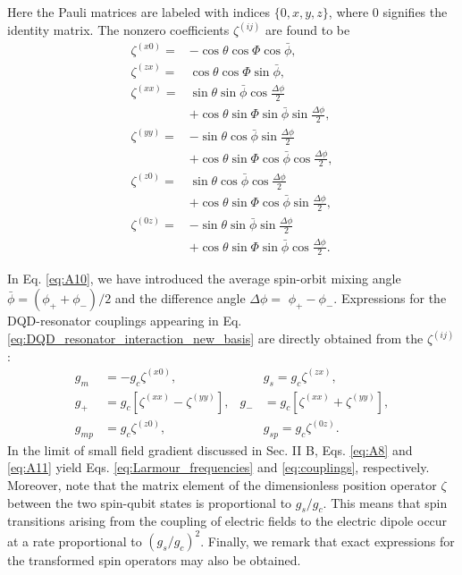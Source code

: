 \documentclass[12pt]{article}
\begin{document}
Here the Pauli matrices are labeled with indices $\{0, x, y, z\}$, where 0 signifies the identity matrix. The nonzero coefficients
$\zeta^{(i j)}$ are found to be
\begin{equation}\label{eq:A10}
    \begin{aligned}
        \zeta^{(x 0)}= & -\cos \theta \cos \Phi \cos \bar{\phi}, \\
        \zeta^{(z x)}= & \cos \theta \cos \Phi \sin \bar{\phi}, \\
        \zeta^{(x x)}= & \sin \theta \sin \bar{\phi} \cos \frac{\Delta \phi}{2} \\
        & +\cos \theta \sin \Phi \sin \bar{\phi} \sin \frac{\Delta \phi}{2}, \\
        \zeta^{(y y)}= & -\sin \theta \cos \bar{\phi} \sin \frac{\Delta \phi}{2} \\
        & +\cos \theta \sin \Phi \cos \bar{\phi} \cos \frac{\Delta \phi}{2}, \\
        \zeta^{(z 0)}= & \sin \theta \cos \bar{\phi} \cos \frac{\Delta \phi}{2} \\
        & +\cos \theta \sin \Phi \cos \bar{\phi} \sin \frac{\Delta \phi}{2}, \\
        \zeta^{(0 z)}= & -\sin \theta \sin \bar{\phi} \sin \frac{\Delta \phi}{2} \\
        & +\cos \theta \sin \Phi \sin \bar{\phi} \cos \frac{\Delta \phi}{2} .
        \end{aligned}
\end{equation}


In Eq. \ref{eq:A10}, we have introduced the average spin-orbit mixing angle $\bar{\phi}=\left(\phi_{+}+\phi_{-}\right) / 2$ and the difference angle $\Delta \phi=$ $\phi_{+}-\phi_{-}$. 
Expressions for the DQD-resonator couplings appearing in Eq. \ref{eq:DQD_resonator_interaction_new_basis} are directly obtained from the $\zeta^{(i j)}$ :
\begin{equation}\label{eq:A11}
    \begin{aligned}
        g_m & =-g_c \zeta^{(x 0)}, & & g_s=g_c \zeta^{(z x)}, \\
        g_{+} & =g_c\left[\zeta^{(x x)}-\zeta^{(y y)}\right], & g_{-} & =g_c\left[\zeta^{(x x)}+\zeta^{(y y)}\right], \\
        g_{m p} & =g_c \zeta^{(z 0)}, & & g_{s p}=g_c \zeta^{(0 z)} .
        \end{aligned}
\end{equation}
In the limit of small field gradient discussed in Sec. II B, Eqs. \ref{eq:A8} and \ref{eq:A11} yield Eqs. \ref{eq:Larmour_frequencies} and \ref{eq:couplings}, respectively. 
Moreover, note that the matrix element of the dimensionless position operator $\zeta$ between the two spin-qubit states is proportional to $g_s / g_c$. 
This means that spin transitions arising from the coupling of electric fields to the electric dipole occur at a rate proportional to $\left(g_s / g_c\right)^2$. 
Finally, we remark that exact expressions for the transformed spin operators may also be obtained.

\printbibliography
\end{document}
